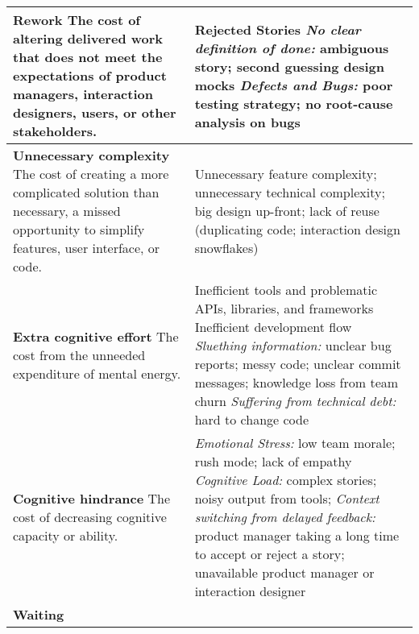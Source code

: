 \begin{table*}[htbp]
\begin{tabular}{|p{2.5in}|p{3.6in}|}
\textbf{Rework } 
\newline The cost of altering delivered work that does not meet the expectations of product managers, interaction designers, users, or other stakeholders.    & Rejected Stories \newline \textit{No clear definition of done:} ambiguous story; second guessing design mocks \newline \textit{Defects and Bugs:} poor testing strategy; no root-cause analysis on bugs                                                                     \\ \hline
\textbf{Unnecessary complexity} \newline 
The cost of creating a more complicated solution than necessary,  a missed opportunity to simplify features, user interface, or code.      & Unnecessary feature complexity; unnecessary technical complexity; big design up-front;  lack of reuse (duplicating code; interaction design snowflakes)                                                
\\ \hline
\textbf{Extra cognitive effort} 
\newline   The cost from the unneeded expenditure of mental energy.                                                                                                                 & Inefficient tools and problematic APIs, libraries, and frameworks  \newline Inefficient development flow \newline \textit{Sluething information:} unclear bug reports; messy code; unclear commit messages; knowledge loss from team churn \newline\textit{Suffering from technical debt:} hard to change code
\\ \hline
\textbf{Cognitive hindrance} \newline 
The cost of decreasing cognitive capacity or ability.  & 
\textit{Emotional Stress:} low team morale; rush mode; lack of empathy \newline \textit{Cognitive Load:} complex stories; noisy output from tools; \newline \textit{Context switching from delayed feedback:} product manager taking a long time to accept or reject a story; unavailable product manager or interaction designer                                                                                                                                                        \\ \hline
\textbf{Waiting} \newline 

\end{tabular}
\end{table*}
